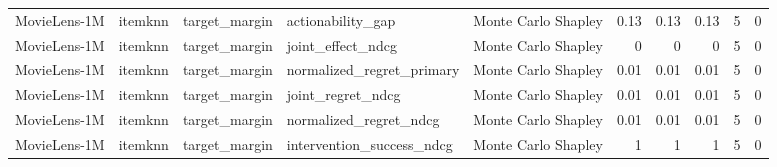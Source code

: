 \begin{table}[t]
{\begin{tabular}{lllllrrrrr}
MovieLens-1M & itemknn & target\_margin & actionability\_gap & Monte Carlo Shapley & 0.13 & 0.13 & 0.13 & 5 & 0 \\
MovieLens-1M & itemknn & target\_margin & joint\_effect\_ndcg & Monte Carlo Shapley & 0 & 0 & 0 & 5 & 0 \\
MovieLens-1M & itemknn & target\_margin & normalized\_regret\_primary & Monte Carlo Shapley & 0.01 & 0.01 & 0.01 & 5 & 0 \\
MovieLens-1M & itemknn & target\_margin & joint\_regret\_ndcg & Monte Carlo Shapley & 0.01 & 0.01 & 0.01 & 5 & 0 \\
MovieLens-1M & itemknn & target\_margin & normalized\_regret\_ndcg & Monte Carlo Shapley & 0.01 & 0.01 & 0.01 & 5 & 0 \\
MovieLens-1M & itemknn & target\_margin & intervention\_success\_ndcg & Monte Carlo Shapley & 1 & 1 & 1 & 5 & 0 \\
\bottomrule
\end{tabular}
}
\end{table}
